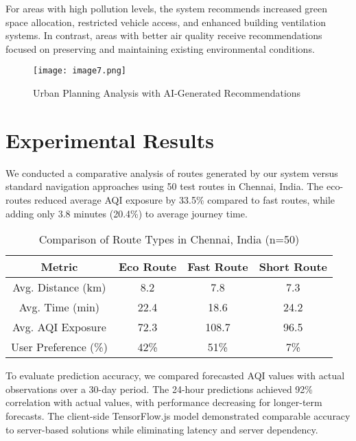 \documentclass[conference]{IEEEtran}
\begin{document}
For areas with high pollution levels, the system recommends increased green space allocation, restricted vehicle access, and enhanced building ventilation systems. In contrast, areas with better air quality receive recommendations focused on preserving and maintaining existing environmental conditions.

\begin{figure}
    \centering
    \texttt{[image: image7.png]}
    \caption{Urban Planning Analysis with AI-Generated Recommendations}
    \label{fig:enter-label}
\end{figure}

\section{Experimental Results}

We conducted a comparative analysis of routes generated by our system versus standard navigation approaches using 50 test routes in Chennai, India. The eco-routes reduced average AQI exposure by 33.5\% compared to fast routes, while adding only 3.8 minutes (20.4\%) to average journey time.

\begin{table}[htbp]
\caption{Comparison of Route Types in Chennai, India (n=50)}
\begin{center}
\begin{tabular}{|c|c|c|c|}
\hline
\textbf{Metric} & \textbf{Eco Route} & \textbf{Fast Route} & \textbf{Short Route} \\
\hline
Avg. Distance (km) & 8.2 & 7.8 & 7.3 \\
\hline
Avg. Time (min) & 22.4 & 18.6 & 24.2 \\
\hline
Avg. AQI Exposure & 72.3 & 108.7 & 96.5 \\
\hline
User Preference (\%) & 42\% & 51\% & 7\% \\
\hline
\end{tabular}
\label{tab:route_comparison}
\end{center}
\end{table}

To evaluate prediction accuracy, we compared forecasted AQI values with actual observations over a 30-day period. The 24-hour predictions achieved 92\% correlation with actual values, with performance decreasing for longer-term forecasts. The client-side TensorFlow.js model demonstrated comparable accuracy to server-based solutions while eliminating latency and server dependency.
\end{document}
